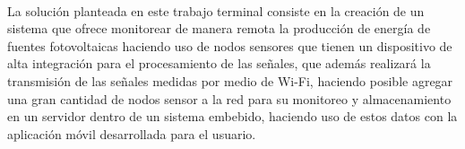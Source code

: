 \paragraph{}
La solución planteada en este trabajo terminal consiste en la creación de un sistema que ofrece monitorear de manera remota la producción de energía de fuentes fotovoltaicas haciendo uso de nodos sensores que tienen un dispositivo de alta integración para el procesamiento de las señales, que además realizará la transmisión de las señales medidas por medio de Wi-Fi, haciendo posible agregar una gran cantidad de nodos sensor a la red para su monitoreo y almacenamiento en un servidor dentro de un sistema embebido, haciendo uso de estos datos con la aplicación móvil desarrollada para el usuario.